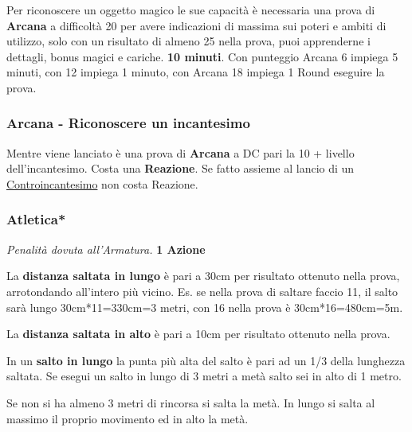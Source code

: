 \begin{multicols}{2}
Per riconoscere un oggetto magico le sue capacità è necessaria una prova di \textbf{Arcana} a difficoltà 20 per avere indicazioni di massima sui poteri e ambiti di utilizzo, solo con un risultato di almeno 25 nella prova, puoi apprenderne i dettagli, bonus magici e cariche. \textbf{10 minuti}. Con punteggio Arcana 6 impiega 5 minuti, con 12 impiega 1 minuto, con Arcana 18 impiega 1 Round eseguire la prova.

\titlespacing*{\subsubsection}{0pt}{0.5em}{0.5em}\subsubsection*{Arcana - Riconoscere un incantesimo}  \label{riconoscereincantesimo}\hypertarget{riconoscereincantesimo}{}
Mentre viene lanciato è una prova di \textbf{Arcana} a DC pari la 10 + livello dell'incantesimo. Costa una \textbf{Reazione}. Se fatto assieme al lancio di un \hyperlink{Controincantesimo}{Controincantesimo} non costa Reazione.

\titlespacing*{\subsubsection}{0pt}{0.5em}{0.5em}\subsubsection*{Atletica*} \emph{Penalità dovuta all'Armatura.} \textbf{1 Azione}\label{atletica}\label{saltare}

La \textbf{distanza saltata in lungo} è pari a 30cm per risultato ottenuto nella prova, arrotondando all'intero più vicino. Es. se nella prova di saltare faccio 11, il salto sarà lungo 30cm*11=330cm=3 metri, con 16 nella prova è 30cm*16=480cm=5m.

La \textbf{distanza saltata in alto} è pari a 10cm per risultato ottenuto nella prova.

In un \textbf{salto in lungo} la punta più alta del salto è pari ad un 1/3 della lunghezza saltata. Se esegui un salto in lungo di 3 metri a metà salto sei in alto di 1 metro.

Se non si ha almeno 3 metri di rincorsa si salta la metà. In lungo si salta al massimo il proprio movimento ed in alto la metà.


\end{multicols}

